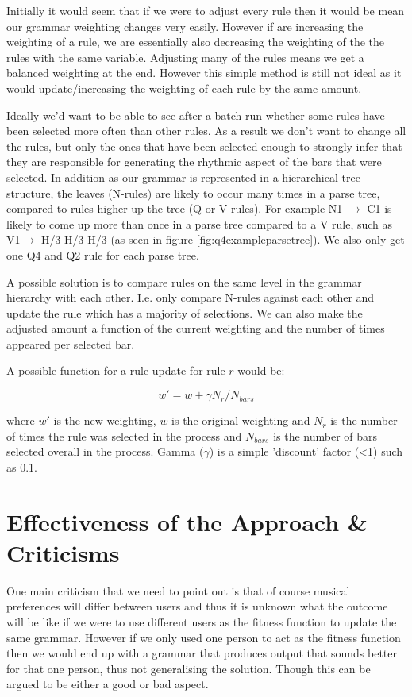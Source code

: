 \documentclass[pdftex,12pt,a4paper]{report}
\begin{document}
Initially it would seem that if we were to adjust every rule then it would be mean our grammar weighting changes very easily. However if are increasing the weighting of a rule, we are essentially also decreasing the weighting of the the rules with the same variable. Adjusting many of the rules means we get a balanced weighting at the end. However this simple method is still not ideal as it would update/increasing the weighting of each rule by the same amount.

Ideally we'd want to be able to see after a batch run whether some rules have been selected more often than other rules. As a result we don't want to change all the rules, but only the ones that have been selected enough to strongly infer that they are responsible for generating the rhythmic aspect of the bars that were selected. In addition as our grammar is represented in a hierarchical tree structure, the leaves (N-rules) are likely to occur many times in a parse tree, compared to rules higher up the tree (Q or V rules). For example N1 $\rightarrow$ C1 is likely to come up more than once in a parse tree compared to a V rule, such as V1$\rightarrow$ H/3 H/3 H/3 (as seen in figure \ref{fig:q4exampleparsetree}). We also only get one Q4 and Q2 rule for each parse tree. 

A possible solution is to compare rules on the same level in the grammar hierarchy with each other. I.e. only compare N-rules against each other and update the rule which has a majority of selections. We can also make the adjusted amount a function of the current weighting and the number of times appeared per selected bar.

A possible function for a rule update for rule $r$ would be:

\[w' = w + \gamma N_r/N_{bars}\]


where $w'$ is the new weighting, $w$ is the original weighting and $N_r$ is the number of times the rule was selected in the process and $N_{bars}$ is the number of bars selected overall in the process. Gamma ($\gamma$) is a simple 'discount' factor (\textless  1) such as 0.1.

\section{Effectiveness of the Approach \& Criticisms}
One main criticism that we need to point out is that of course musical preferences will differ between users and thus it is unknown what the outcome will be like if we were to use different users as the fitness function to update the same grammar. However if we only used one person to act as the fitness function then we would end up with a grammar that produces output that sounds better for that one person, thus not generalising the solution. Though this can be argued to be either a good or bad aspect.
\end{document}
